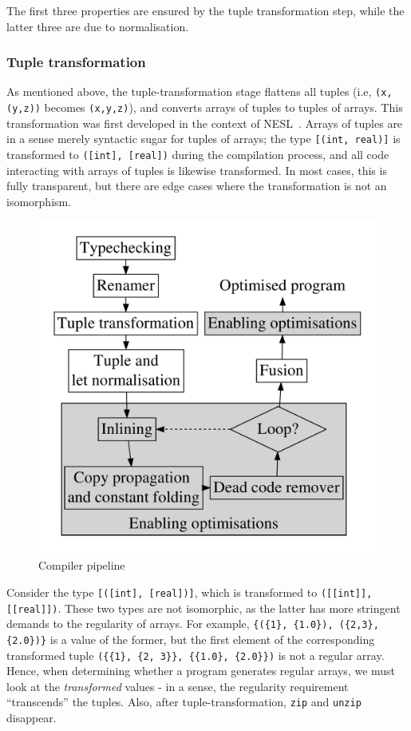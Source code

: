 \documentclass{sigplanconf}  %
\begin{document}
The first three properties are ensured by the tuple transformation
step, while the latter three are due to normalisation.

\subsubsection{Tuple transformation}
\label{sec:tuple-transformation}

As mentioned above, the tuple-transformation stage flattens all tuples
(i.e, {\tt (x,(y,z))} becomes {\tt (x,y,z)}), and converts arrays of
tuples to tuples of arrays.  This transformation was first developed
in the context of NESL~\cite{blelloch1994implementation}.  Arrays of
tuples are in a sense merely syntactic sugar for tuples of arrays; the
type {\tt [(int, real)]} is transformed to {\tt ([int], [real])}
during the compilation process, and all code interacting with arrays
of tuples is likewise transformed.  In most cases, this is fully
transparent, but there are edge cases where the transformation is not
an isomorphism.

\begin{figure}[bt]
\begin{center}
\includegraphics[width=0.7\columnwidth]{Figures/pipeline}
\end{center}
\caption{Compiler pipeline}
\label{fig:l0cpipeline}
\end{figure}

Consider the type {\tt [([int], [real])]}, which is transformed to
{\tt([[int]], [[real]])}.  These two types are not isomorphic, as the
latter has more stringent demands to the regularity of arrays.  For
example, {\tt\{(\{1\}, \{1.0\}), (\{2,3\}, \{2.0\})\}} is a value of
the former, but the first element of the corresponding transformed
tuple {\tt(\{\{1\}, \{2, 3\}\}, \{\{1.0\}, \{2.0\}\})} is not a regular
array.  Hence, when determining whether a program generates regular
arrays, we must look at the \textit{transformed} values - in a sense,
the regularity requirement ``transcends'' the tuples.  Also, after
tuple-transformation, {\tt zip} and {\tt unzip} disappear.
\end{document}
